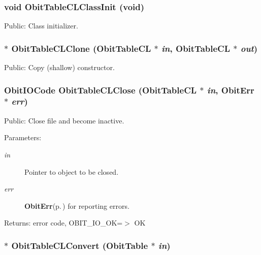 \subsubsection{\setlength{\rightskip}{0pt plus 5cm}void Obit\-Table\-CLClass\-Init (void)}\label{ObitTableCL_8h_a10}


Public: Class initializer. 

\subsubsection{$\ast$ Obit\-Table\-CLClone ({\bf Obit\-Table\-CL} $\ast$ {\em in}, {\bf Obit\-Table\-CL} $\ast$ {\em out})}\label{ObitTableCL_8h_a15}


Public: Copy (shallow) constructor. 

\subsubsection{\setlength{\rightskip}{0pt plus 5cm}Obit\-IOCode Obit\-Table\-CLClose ({\bf Obit\-Table\-CL} $\ast$ {\em in}, {\bf Obit\-Err} $\ast$ {\em err})}\label{ObitTableCL_8h_a21}


Public: Close file and become inactive. 

\begin{Desc}
\item[Parameters:]
\begin{description}
\item[{\em in}]Pointer to object to be closed. \item[{\em err}]{\bf Obit\-Err}{\rm (p.\,\pageref{structObitErr})} for reporting errors. \end{description}
\end{Desc}
\begin{Desc}
\item[Returns:]error code, OBIT\_\-IO\_\-OK=$>$ OK \end{Desc}
\subsubsection{$\ast$ Obit\-Table\-CLConvert ({\bf Obit\-Table} $\ast$ {\em in})}\label{ObitTableCL_8h_a16}


